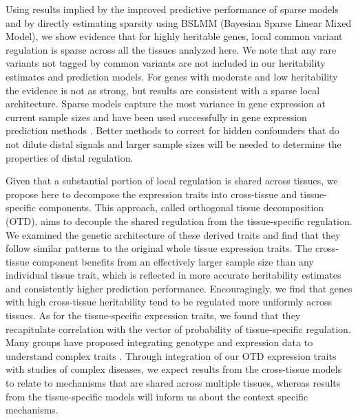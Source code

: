 \documentclass[10pt,letterpaper]{article}
\begin{document}
Using results implied by the improved predictive performance of sparse models and by directly estimating sparsity using BSLMM (Bayesian Sparse Linear Mixed Model), we show evidence that for highly heritable genes, local common variant regulation is sparse across all the tissues analyzed here. We note that any rare variants not tagged by common variants are not included in our heritability estimates and prediction models. For genes with moderate and low heritability the evidence is not as strong, but results are consistent with a sparse local architecture. Sparse models capture the most variance in gene expression at current sample sizes and have been used successfully in gene expression prediction methods \cite{manor2013robust,Gamazon_2015,gusev2016integrative,zhu2016integration}. Better methods to correct for hidden confounders that do not dilute distal signals and larger sample sizes will be needed to determine the properties of distal regulation. 

Given that a substantial portion of local regulation is shared across tissues, we propose here to decompose the expression traits into cross-tissue and tissue-specific components. This approach, called orthogonal tissue decomposition (OTD), aims to decouple the shared regulation from the tissue-specific regulation. We examined the genetic architecture of these derived traits and find that they follow similar patterns to the original whole tissue expression traits. The cross-tissue component benefits from an effectively larger sample size than any individual tissue trait, which is reflected in more accurate heritability estimates and consistently higher prediction performance. Encouragingly, we find that genes with high cross-tissue heritability tend to be regulated more uniformly across tissues. As for the tissue-specific expression traits, we found that they recapitulate correlation with the vector of probability of tissue-specific regulation. Many groups have proposed integrating genotype and expression data to understand complex traits \cite{Gamazon_2015,giambartolomei2014bayesian,gusev2016integrative,he2013sherlock,Wheeler_2014,zhu2016integration}. Through integration of our OTD expression traits with studies of complex diseases, we expect results from the cross-tissue models to relate to mechanisms that are shared across multiple tissues, whereas results from the tissue-specific models will inform us about the context specific mechanisms. 
\end{document}

